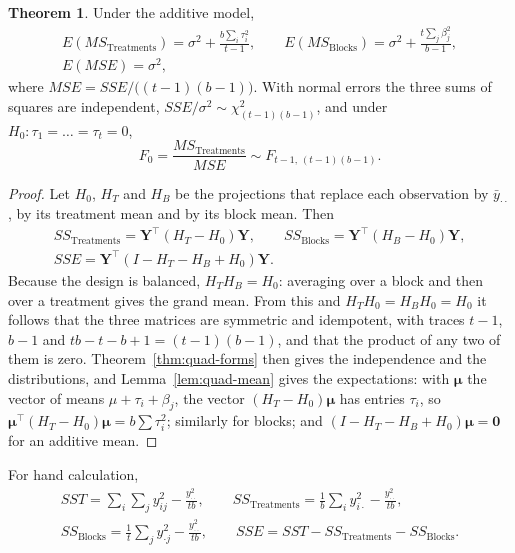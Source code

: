 \documentclass[11pt,a4paper]{article}
\numberwithin{equation}{section}
\theoremstyle{definition}
\newtheorem{thm}{Theorem}[subsection]
\begin{document}
\begin{thm}\label{thm:rcbd-ems}
Under the additive model,
\begin{gather*}
E(MS_{\mathrm{Treatments}}) = \sigma^2 + \frac{b\sum_i\tau_i^2}{t - 1} , \qquad E(MS_{\mathrm{Blocks}}) = \sigma^2 + \frac{t\sum_j\beta_j^2}{b - 1} , \\
E(MSE) = \sigma^2 ,
\end{gather*}
where $MSE = SSE/\bigl((t - 1)(b - 1)\bigr)$. With normal errors the three sums of squares are independent, $SSE/\sigma^2 \sim \chi^2_{(t-1)(b-1)}$, and under
$H_0 : \tau_1 = \dots = \tau_t = 0$,
\[
F_0 = \frac{MS_{\mathrm{Treatments}}}{MSE} \sim F_{t-1,\,(t-1)(b-1)} .
\]
\end{thm}

\begin{proof}
Let $H_0$, $H_T$ and $H_B$ be the projections that replace each observation by $\bar y_{\cdot\cdot}$, by its treatment mean and by its block mean. Then
\begin{gather*}
SS_{\mathrm{Treatments}} = \mathbf Y^\top(H_T - H_0)\mathbf Y , \qquad SS_{\mathrm{Blocks}} = \mathbf Y^\top(H_B - H_0)\mathbf Y , \\
SSE = \mathbf Y^\top(I - H_T - H_B + H_0)\mathbf Y .
\end{gather*}
Because the design is balanced, $H_TH_B = H_0$: averaging over a block and then over a treatment gives the grand mean. From this and
$H_TH_0 = H_BH_0 = H_0$ it follows that the three matrices are symmetric and idempotent, with traces $t - 1$, $b - 1$ and $tb - t - b + 1 = (t - 1)(b - 1)$, and that the
product of any two of them is zero. Theorem~\ref{thm:quad-forms} then gives the independence and the distributions, and
Lemma~\ref{lem:quad-mean} gives the expectations: with $\boldsymbol\mu$ the vector of means $\mu + \tau_i + \beta_j$, the vector $(H_T - H_0)\boldsymbol\mu$ has entries $\tau_i$, so
$\boldsymbol\mu^\top(H_T - H_0)\boldsymbol\mu = b\sum\tau_i^2$; similarly for blocks; and $(I - H_T - H_B + H_0)\boldsymbol\mu = \mathbf 0$ for an additive mean.
\end{proof}

For hand calculation,
\begin{gather*}
SST = \sum_i\sum_jy_{ij}^2 - \frac{y_{\cdot\cdot}^2}{tb} , \qquad SS_{\mathrm{Treatments}} = \frac1b\sum_iy_{i\cdot}^2 - \frac{y_{\cdot\cdot}^2}{tb} , \\
SS_{\mathrm{Blocks}} = \frac1t\sum_jy_{\cdot j}^2 - \frac{y_{\cdot\cdot}^2}{tb} , \qquad SSE = SST - SS_{\mathrm{Treatments}} - SS_{\mathrm{Blocks}} .
\end{gather*}
\end{document}
